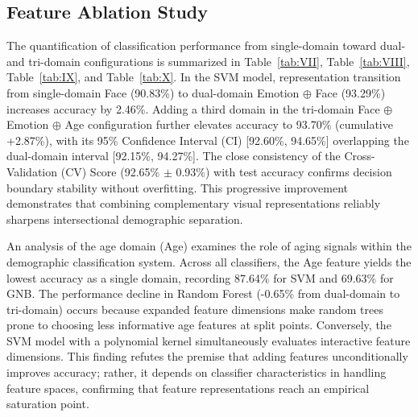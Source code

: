 \subsection{Feature Ablation Study}
\label{sec:feature_ablation}
\label{sec:feature_ablation_study}

The quantification of classification performance from single-domain toward dual- and tri-domain configurations is summarized in Table~\ref{tab:VII}, Table~\ref{tab:VIII}, Table~\ref{tab:IX}, and Table~\ref{tab:X}. In the SVM model, representation transition from single-domain Face (90.83\%) to dual-domain Emotion $\oplus$ Face (93.29\%) increases accuracy by 2.46\%. Adding a third domain in the tri-domain Face $\oplus$ Emotion $\oplus$ Age configuration further elevates accuracy to 93.70\% (cumulative +2.87\%), with its 95\% Confidence Interval (CI) [92.60\%, 94.65\%] overlapping the dual-domain interval [92.15\%, 94.27\%]. The close consistency of the Cross-Validation (CV) Score (92.65\% $\pm$ 0.93\%) with test accuracy confirms decision boundary stability without overfitting. This progressive improvement demonstrates that combining complementary visual representations reliably sharpens intersectional demographic separation.

An analysis of the age domain (Age) examines the role of aging signals within the demographic classification system. Across all classifiers, the Age feature yields the lowest accuracy as a single domain, recording 87.64\% for SVM and 69.63\% for GNB. The performance decline in Random Forest (-0.65\% from dual-domain to tri-domain) occurs because expanded feature dimensions make random trees prone to choosing less informative age features at split points. Conversely, the SVM model with a polynomial kernel simultaneously evaluates interactive feature dimensions. This finding refutes the premise that adding features unconditionally improves accuracy; rather, it depends on classifier characteristics in handling feature spaces, confirming that feature representations reach an empirical saturation point.
